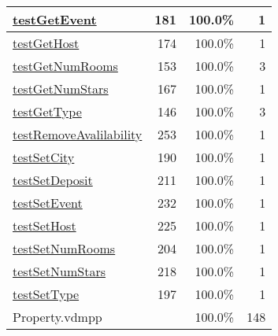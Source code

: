\begin{longtable}{|l|r|r|r|}
\hline
\hyperref[testGetEvent:181]{testGetEvent} & 181&100.0\% & 1 \\
\hline
\hyperref[testGetHost:174]{testGetHost} & 174&100.0\% & 1 \\
\hline
\hyperref[testGetNumRooms:153]{testGetNumRooms} & 153&100.0\% & 3 \\
\hline
\hyperref[testGetNumStars:167]{testGetNumStars} & 167&100.0\% & 1 \\
\hline
\hyperref[testGetType:146]{testGetType} & 146&100.0\% & 3 \\
\hline
\hyperref[testRemoveAvalilability:253]{testRemoveAvalilability} & 253&100.0\% & 1 \\
\hline
\hyperref[testSetCity:190]{testSetCity} & 190&100.0\% & 1 \\
\hline
\hyperref[testSetDeposit:211]{testSetDeposit} & 211&100.0\% & 1 \\
\hline
\hyperref[testSetEvent:232]{testSetEvent} & 232&100.0\% & 1 \\
\hline
\hyperref[testSetHost:225]{testSetHost} & 225&100.0\% & 1 \\
\hline
\hyperref[testSetNumRooms:204]{testSetNumRooms} & 204&100.0\% & 1 \\
\hline
\hyperref[testSetNumStars:218]{testSetNumStars} & 218&100.0\% & 1 \\
\hline
\hyperref[testSetType:197]{testSetType} & 197&100.0\% & 1 \\
\hline
\hline
Property.vdmpp & & 100.0\% & 148 \\
\hline
\end{longtable}

